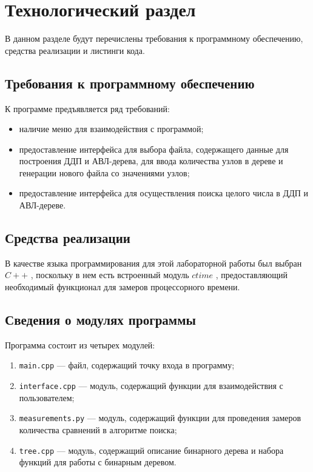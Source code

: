\chapter{Технологический раздел}

В данном разделе будут перечислены требования к программному обеспечению, средства реализации и листинги кода.

\section{Требования к программному обеспечению}

К программе предъявляется ряд требований:

\begin{itemize} [label=--]
	\item наличие меню для взаимодействия с программой;
	\item предоставление интерфейса для выбора файла, содержащего данные для построения ДДП и АВЛ-дерева, для ввода количества узлов в дереве и генерации нового файла со значениями узлов;
	\item предоставление интерфейса для осуществления поиска целого числа в ДДП и АВЛ-дереве.
\end{itemize}

\section{Средства реализации}

В качестве языка программирования для этой лабораторной работы был выбран $C++$ \cite{pl}, поскольку в нем есть встроенный модуль $ctime$ \cite{cpu_time_func}, предоставляющий необходимый функционал для замеров процессорного времени.

\section{Сведения о модулях программы}

Программа состоит из четырех модулей: 

\begin{enumerate}[label={\arabic*)}]
	\item \texttt{main.cpp} --- файл, содержащий точку входа в программу;
	\item \texttt{interface.cpp} --- модуль, содержащий функции для взаимодействия с пользователем;
	\item \texttt{measurements.py} --- модуль, содержащий функции для проведения замеров количества сравнений в алгоритме поиска;
	\item \texttt{tree.cpp} --- модуль, содержащий описание бинарного дерева и набора функций для работы с бинарным деревом.
\end{enumerate}

